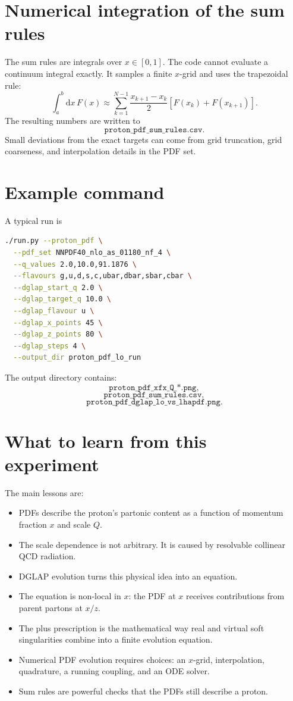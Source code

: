 \documentclass[11pt]{article}
\newcommand{\dd}{\mathrm{d}}
\begin{document}
\section{Numerical integration of the sum rules}

The sum rules are integrals over \(x\in[0,1]\).  The code cannot evaluate a
continuum integral exactly.  It samples a finite \(x\)-grid and uses the
trapezoidal rule:
\[
  \int_a^b \dd x\,F(x)
  \approx
  \sum_{k=1}^{N-1}
  \frac{x_{k+1}-x_k}{2}
  \left[
    F(x_k)+F(x_{k+1})
    \right].
\]
The resulting numbers are written to
\[
  \texttt{proton\_pdf\_sum\_rules.csv}.
\]
Small deviations from the exact targets can come from grid truncation, grid
coarseness, and interpolation details in the PDF set.

\section{Example command}

A typical run is
\begin{lstlisting}[language=bash]
./run.py --proton_pdf \
  --pdf_set NNPDF40_nlo_as_01180_nf_4 \
  --q_values 2.0,10.0,91.1876 \
  --flavours g,u,d,s,c,ubar,dbar,sbar,cbar \
  --dglap_start_q 2.0 \
  --dglap_target_q 10.0 \
  --dglap_flavour u \
  --dglap_x_points 45 \
  --dglap_z_points 80 \
  --dglap_steps 4 \
  --output_dir proton_pdf_lo_run
\end{lstlisting}
The output directory contains:
\[
  \texttt{proton\_pdf\_xfx\_Q\_*.png},
\]
\[
  \texttt{proton\_pdf\_sum\_rules.csv},
\]
\[
  \texttt{proton\_pdf\_dglap\_lo\_vs\_lhapdf.png}.
\]

\section{What to learn from this experiment}

The main lessons are:
\begin{itemize}
  \item PDFs describe the proton's partonic content as a function of momentum
        fraction \(x\) and scale \(Q\).
  \item The scale dependence is not arbitrary.  It is caused by resolvable
        collinear QCD radiation.
  \item DGLAP evolution turns this physical idea into an equation.
  \item The equation is non-local in \(x\): the PDF at \(x\) receives
        contributions from parent partons at \(x/z\).
  \item The plus prescription is the mathematical way real and virtual soft
        singularities combine into a finite evolution equation.
  \item Numerical PDF evolution requires choices: an \(x\)-grid, interpolation,
        quadrature, a running coupling, and an ODE solver.
  \item Sum rules are powerful checks that the PDFs still describe a proton.
\end{itemize}
\end{document}
